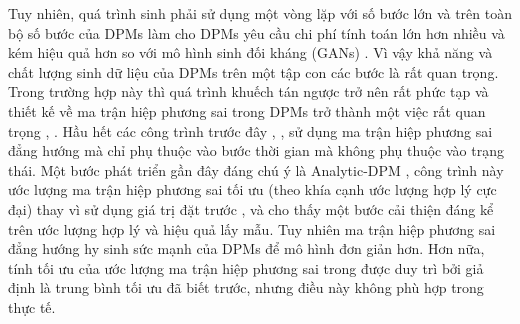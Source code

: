 \documentclass[14pt, a4paper]{article}
\numberwithin{equation}{section}
\numberwithin{figure}{section}
\numberwithin{dl}{section}
\numberwithin{md}{section}
\numberwithin{bd}{section}
\numberwithin{dn}{section}
\numberwithin{hq}{section}
\begin{document}
    Tuy nhiên, quá trình sinh phải sử dụng một vòng lặp với số bước lớn và trên toàn bộ số bước của DPMs làm cho DPMs yêu cầu chi phí tính toán lớn hơn nhiều và kém hiệu quả hơn so với mô hình sinh đối kháng (GANs) \cite{goodfellow2014generative}.
    Vì vậy khả năng và chất lượng sinh dữ liệu của DPMs trên một tập con các bước là rất quan trọng.
    Trong trường hợp này thì quá trình khuếch tán ngược trở nên rất phức tạp \cite{xiao2021tackling} và thiết kế về ma trận hiệp phương sai trong DPMs trở thành một việc rất quan trọng \cite{nichol2021glide}, \cite{bao2021analytic}.
    Hầu hết các công trình trước đây \cite{ho2020denoising}, \cite{song2020denoising}, \cite{bao2021analytic} sử dụng ma trận hiệp phương sai đẳng hướng mà chỉ phụ thuộc vào bước thời gian mà không phụ thuộc vào trạng thái.
    Một bước phát triển gần đây đáng chú ý là Analytic-DPM \cite{bao2021analytic},
    công trình này ước lượng ma trận hiệp phương sai tối ưu (theo khía cạnh ước lượng hợp lý cực đại) thay vì sử dụng giá trị đặt trước \cite{ho2020denoising}, \cite{song2020denoising} và cho thấy một bước cải thiện đáng kể trên ước lượng hợp lý và hiệu quả lấy mẫu.
    Tuy nhiên ma trận hiệp phương sai đẳng hướng hy sinh sức mạnh của DPMs để mô hình đơn giản hơn.
    Hơn nữa, tính tối ưu của ước lượng ma trận hiệp phương sai trong \cite{bao2021analytic} được duy trì bởi giả định là trung bình tối ưu đã biết trước,
    nhưng điều này không phù hợp trong thực tế.




    \newpage
    \printbibliography[title={TÀI LIỆU THAM KHẢO}]
\end{document}
